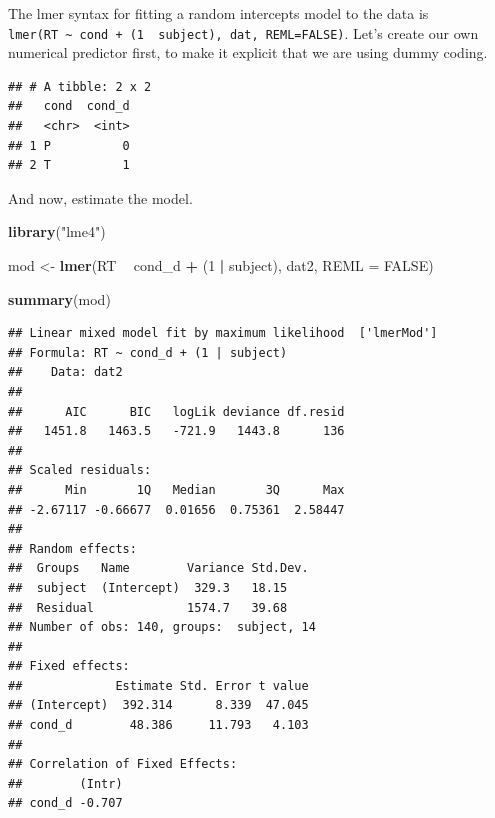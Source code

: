 \documentclass[]{book}
\newenvironment{Shaded}{\begin{snugshade}}{\end{snugshade}}
\newcommand{\CommentTok}[1]{\textcolor[rgb]{0.56,0.35,0.01}{\textit{#1}}}
\newcommand{\DataTypeTok}[1]{\textcolor[rgb]{0.13,0.29,0.53}{#1}}
\newcommand{\DecValTok}[1]{\textcolor[rgb]{0.00,0.00,0.81}{#1}}
\newcommand{\KeywordTok}[1]{\textcolor[rgb]{0.13,0.29,0.53}{\textbf{#1}}}
\newcommand{\NormalTok}[1]{#1}
\newcommand{\OperatorTok}[1]{\textcolor[rgb]{0.81,0.36,0.00}{\textbf{#1}}}
\newcommand{\OtherTok}[1]{\textcolor[rgb]{0.56,0.35,0.01}{#1}}
\newcommand{\StringTok}[1]{\textcolor[rgb]{0.31,0.60,0.02}{#1}}
\begin{document}
The lmer syntax for fitting a random intercepts model to the data is \texttt{lmer(RT\ \textasciitilde{}\ cond\ +\ (1\ \textbar{}\ subject),\ dat,\ REML=FALSE)}. Let's create our own numerical predictor first, to make it explicit that we are using dummy coding.

\begin{Shaded}
\end{Shaded}

\begin{verbatim}
## # A tibble: 2 x 2
##   cond  cond_d
##   <chr>  <int>
## 1 P          0
## 2 T          1
\end{verbatim}

And now, estimate the model.

\begin{Shaded}
\begin{Highlighting}[]
\KeywordTok{library}\NormalTok{(}\StringTok{"lme4"}\NormalTok{)}

\NormalTok{mod <-}\StringTok{ }\KeywordTok{lmer}\NormalTok{(RT }\OperatorTok{~}\StringTok{ }\NormalTok{cond_d }\OperatorTok{+}\StringTok{ }\NormalTok{(}\DecValTok{1} \OperatorTok{|}\StringTok{ }\NormalTok{subject), dat2, }\DataTypeTok{REML =} \OtherTok{FALSE}\NormalTok{)}

\KeywordTok{summary}\NormalTok{(mod)}
\end{Highlighting}
\end{Shaded}

\begin{verbatim}
## Linear mixed model fit by maximum likelihood  ['lmerMod']
## Formula: RT ~ cond_d + (1 | subject)
##    Data: dat2
## 
##      AIC      BIC   logLik deviance df.resid 
##   1451.8   1463.5   -721.9   1443.8      136 
## 
## Scaled residuals: 
##      Min       1Q   Median       3Q      Max 
## -2.67117 -0.66677  0.01656  0.75361  2.58447 
## 
## Random effects:
##  Groups   Name        Variance Std.Dev.
##  subject  (Intercept)  329.3   18.15   
##  Residual             1574.7   39.68   
## Number of obs: 140, groups:  subject, 14
## 
## Fixed effects:
##             Estimate Std. Error t value
## (Intercept)  392.314      8.339  47.045
## cond_d        48.386     11.793   4.103
## 
## Correlation of Fixed Effects:
##        (Intr)
## cond_d -0.707
\end{verbatim}
\end{document}
